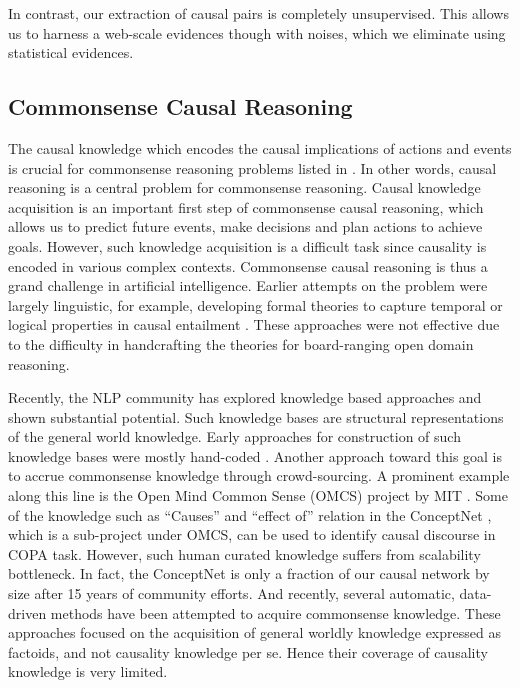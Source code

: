 In contrast, our extraction of causal pairs is completely
unsupervised. This allows us to harness a web-scale evidences though
with noises, which we eliminate using statistical evidences.

\subsection{Commonsense Causal Reasoning}

The causal knowledge which encodes the causal implications of
actions and events is crucial for commonsense reasoning problems
listed in \cite{WinNT}. In other words, causal reasoning is a
central problem for commonsense reasoning. Causal knowledge
acquisition is an important first step of commonsense causal
reasoning, which allows us to predict future events, make decisions
and plan actions to achieve goals. However, such knowledge
acquisition is a difficult task since causality is encoded in
various complex contexts. Commonsense causal reasoning is thus a
grand challenge in artificial intelligence. Earlier attempts on the
problem were largely linguistic, for example, developing formal
theories to capture temporal or logical properties in causal
entailment \cite{LascaridesAO92,lascarides:asher:1993a}. These
approaches were not effective due to the difficulty in handcrafting
the theories for board-ranging open domain reasoning.

Recently, the NLP community has explored knowledge based approaches
and shown substantial potential. Such knowledge bases are structural
representations of the general world knowledge. Early approaches for
construction of such knowledge bases were mostly hand-coded
\cite{lenat1995cyc}. Another approach toward this goal is to accrue
commonsense knowledge through crowd-sourcing. A prominent example
along this line is the Open Mind Common Sense (OMCS) project by MIT
\cite{singh2002open}. Some of the knowledge such as ``Causes'' and
``effect of'' relation in the ConceptNet \cite{liu2004commonsense},
which is a sub-project under OMCS, can be used to identify causal
discourse in COPA task. However, such human curated knowledge
suffers from scalability bottleneck. In fact, the ConceptNet is only
a fraction of our causal network by size after 15 years of community
efforts. And recently, several automatic, data-driven methods have
been attempted to acquire commonsense
knowledge\cite{schubert2002can, gordon2010learning,
gordon2010mining, akbikweltmodell}.
These approaches focused on the acquisition of general
worldly knowledge expressed as factoids, and not causality knowledge
per se. Hence their coverage of causality knowledge is very limited.

